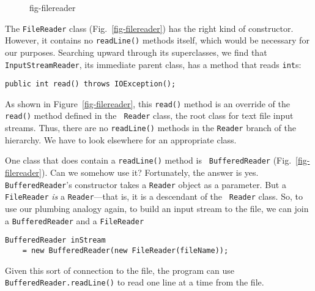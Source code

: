 \begin{figure}[th]
 {fig-filereader}
\end{figure}
The {\tt FileReader} class (Fig.~\ref{fig-filereader}) has the right
kind of constructor.  However, it contains no {\tt readLine()} methods
itself, which would be necessary for our purposes.  Searching upward
through its superclasses, we find that \mbox{\tt InputStreamReader},
its immediate parent class, has a method that reads {\tt int}s:

\begin{jjjlisting}
\begin{lstlisting}
public int read() throws IOException();
\end{lstlisting}
\end{jjjlisting}

\noindent As shown in Figure~\ref{fig-filereader}, this {\tt read()}
method is an override of the {\tt read()} method defined in the {\tt
Reader} class, the root class for text file input streams.  Thus,
there are no {\tt readLine()} methods in the {\tt Reader} branch of
the hierarchy. We have to look elsewhere for an appropriate class.


One class that does contain a {\tt readLine()} method is {\tt
BufferedReader} (Fig.~\ref{fig-filereader}). Can we somehow use it?
Fortunately, the answer is yes.  {\tt BufferedReader}'s constructor
takes a {\tt Reader} object as a parameter.  But a {\tt FileReader}
{\it is} a {\tt Reader}---that is, it is a descendant of the {\tt
Reader} class.  So, to use our plumbing analogy again, to build an
input stream to the file, we can join a {\tt BufferedReader}
and a {\tt FileReader} 

\begin{jjjlisting}
\begin{lstlisting}
BufferedReader inStream
    = new BufferedReader(new FileReader(fileName));
\end{lstlisting}
\end{jjjlisting}

\noindent Given this sort of connection to the file, the
program can use {\tt Buffered\-Reader.readLine()} to read one line at a
time from the file.


